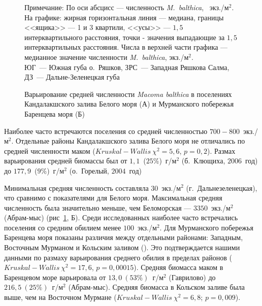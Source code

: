 {{\begin{figure}[ht]
\begin{minipage}[]{.48\linewidth}
\begin{center}
	\end{center}
	\end{minipage}
	\hfill
	\caption{Варьирование средней численности {\it Macoma balthica} в поселениях Кандалакшского залива Белого моря (А) и Мурманского побережья Баренцева моря (Б)}
	{\footnotesize Примечание: По оси абсцисс --- численность {\it M.~balthica}, ~экз./м$^2$.\\
	На графике: жирная горизонтальная линия --- медиана, границы <<ящика>> --- 1 и 3 квартили, <<усы>> --- $1,5$ интерквартильного расстояния, точки - значения выпадающие за $1,5$ интерквартильных расстояния.
Числа в верхней части графика --- медианное значение численности {\it M.~balthica}, экз./м$^2$.\\
 ЮГ~--- Южная губа о.~Ряшков, ЗРС~--- Западная Ряшкова Салма, ДЗ~--- Дальне-Зеленецкая губа}
	\label{ris:N_area}
	\end{figure}

Наиболее часто встречаются поселения со средней численностью $700-800$~экз./м$^2$.
Отдельные районы Кандалакшского залива Белого моря не отличались по средней численности маком ($Kruskal-Wallis\ \chi^2 = 5,6$, $p = 0,2$).
Размах варьирования средней биомассы был от $1,1$~($25$\%)~г/м$^2$ (б.~Клющиха, $2006$~год) до $177,9$~($9$\%)~г/м$^2$ (о.~Горелый, $2004$~год)

Минимальная средняя численность составляла $30$~экз./м$^2$ (г.~Дальнезеленецкая), что сравнимо с показателями для Белого моря. 
Максимальная средняя численность была значительно меньше, чем Беломорская --- $3350$~экз./м$^2$ (Абрам-мыс) (рис~\ref{ris:N_area}, Б).
Среди исследованных наиболее часто встречались поселения со средним обилием менее $100$~экз./м$^2$.
Для Мурманского побережья Баренцева моря показаны различия между отдельными районами: Западным, Восточным Мурманом и Кольским заливом (\cite{Guryanova_Ushakov_1929, Guryanova_et_al_1930}). 
Это подтверждается нашими данными по размаху варьирования среднего обилия в пределах районов ($Kruskal-Wallis\ \chi^2 = 17,6$, $p = 0,00015$).
Средняя биомасса маком в Баренцевом море варьировала от $13,0~(53\%)$~г/м$^2$ (Гаврилово) до $216,5~(25\%)$~г/м$^2$ (Абрам-мыс). Средняя биомасса в Кольском заливе была выше, чем на Восточном Мурмане ($Kruskal-Wallis~\chi^2 = 6,8$; $p = 0,009$).

}}

